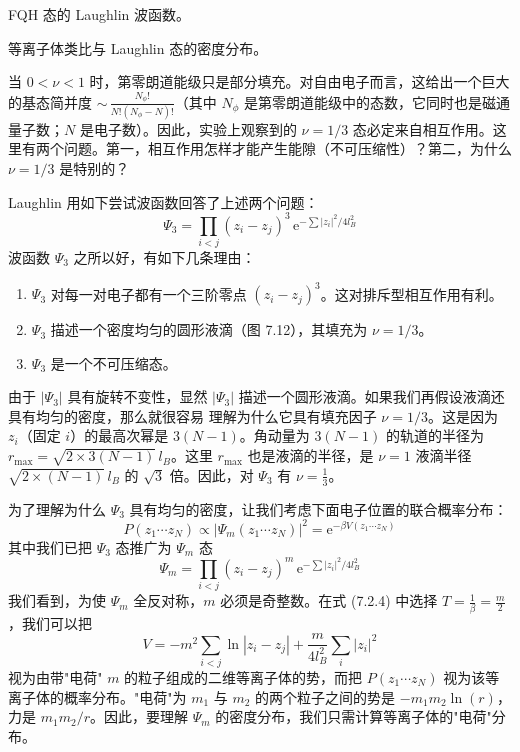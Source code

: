 \begin{keypoints}
\item FQH 态的 Laughlin 波函数。
\item 等离子体类比与 Laughlin 态的密度分布。
\end{keypoints}

当 $0<\nu<1$ 时，第零朗道能级只是部分填充。对自由电子而言，这给出一个巨大的基态简并度 ${\sim}\,\frac{N_\phi!}{N!(N_\phi-N)!}$（其中 $N_\phi$ 是第零朗道能级中的态数，它同时也是磁通量子数；$N$ 是电子数）。因此，实验上观察到的 $\nu=1/3$ 态必定来自相互作用。这里有两个问题。第一，相互作用怎样才能产生能隙（不可压缩性）？第二，为什么 $\nu=1/3$ 是特别的？

Laughlin 用如下尝试波函数回答了上述两个问题：
\begin{equation*}
\Psi_3 = \prod_{i<j}(z_i-z_j)^3\,\mathrm{e}^{-\sum|z_i|^2/4l_B^2}
\end{equation*}
波函数 $\Psi_3$ 之所以好，有如下几条理由：
\begin{enumerate}
\item[a)] $\Psi_3$ 对每一对电子都有一个三阶零点 $(z_i-z_j)^3$。这对排斥型相互作用有利。
\item[b)] $\Psi_3$ 描述一个密度均匀的圆形液滴（图 7.12），其填充为 $\nu=1/3$。
\item[c)] $\Psi_3$ 是一个不可压缩态。
\end{enumerate}

由于 $|\Psi_3|$ 具有旋转不变性，显然 $|\Psi_3|$ 描述一个圆形液滴。如果我们再假设液滴还具有均匀的密度，那么就很容易
理解为什么它具有填充因子 $\nu=1/3$。这是因为 $z_i$（固定 $i$）的最高次幂是 $3(N-1)$。角动量为 $3(N-1)$ 的轨道的半径为 $r_{\max}=\sqrt{2\times 3(N-1)}\,l_B$。这里 $r_{\max}$ 也是液滴的半径，是 $\nu=1$ 液滴半径 $\sqrt{2\times(N-1)}\,l_B$ 的 $\sqrt{3}$ 倍。因此，对 $\Psi_3$ 有 $\nu=\frac{1}{3}$。

为了理解为什么 $\Psi_3$ 具有均匀的密度，让我们考虑下面电子位置的联合概率分布：
\begin{equation*}
P(z_1\cdots z_N)\propto|\Psi_m(z_1\cdots z_N)|^2=\mathrm{e}^{-\beta V(z_1\cdots z_N)}
\tag{7.2.4}
\end{equation*}
其中我们已把 $\Psi_3$ 态推广为 $\Psi_m$ 态
\begin{equation*}
\Psi_m=\prod_{i<j}(z_i-z_j)^m\,\mathrm{e}^{-\sum|z_i|^2/4l_B^2}
\end{equation*}
我们看到，为使 $\Psi_m$ 全反对称，$m$ 必须是奇整数。在式 (7.2.4) 中选择 $T=\frac{1}{\beta}=\frac{m}{2}$，我们可以把
\begin{equation*}
V=-m^2\sum_{i<j}\ln|z_i-z_j|+\frac{m}{4l_B^2}\sum_i|z_i|^2
\end{equation*}
视为由带"电荷" $m$ 的粒子组成的二维等离子体的势，而把 $P(z_1\cdots z_N)$ 视为该等离子体的概率分布。"电荷"为 $m_1$ 与 $m_2$ 的两个粒子之间的势是 $-m_1m_2\ln(r)$，力是 $m_1m_2/r$。因此，要理解 $\Psi_m$ 的密度分布，我们只需计算等离子体的"电荷"分布。

